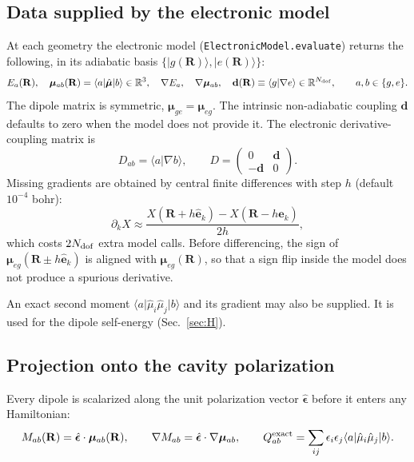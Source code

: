 \documentclass[11pt]{article}
\newcommand{\ket}[1]{\lvert #1 \rangle}
\newcommand{\bra}[1]{\langle #1 \rvert}
\newcommand{\braket}[2]{\langle #1 \vert #2 \rangle}
\newcommand{\R}{\mathbf{R}}
\newcommand{\grad}{\nabla}
\newcommand{\dd}{\mathbf{d}}
\newcommand{\eps}{\hat{\bm{\epsilon}}}
\newcommand{\mub}{\bm{\mu}}
\newcommand{\code}[1]{\texttt{#1}}
\begin{document}
\subsection{Data supplied by the electronic model}
At each geometry the electronic model (\code{ElectronicModel.evaluate}) returns the following, in its adiabatic basis $\{\ket{g(\R)},\ket{e(\R)}\}$:
\begin{equation}
E_a(\R),\quad \mub_{ab}(\R)=\bra{a}\hat{\mub}\ket{b}\in\mathbb{R}^3,\quad
\grad E_a,\quad \grad\mub_{ab},\quad
\dd(\R)\equiv\braket{g}{\grad e}\in\mathbb{R}^{N_{\rm dof}},
\qquad a,b\in\{g,e\}.
\end{equation}
The dipole matrix is symmetric, $\mub_{ge}=\mub_{eg}$. The intrinsic non-adiabatic coupling $\dd$ defaults to zero when the model does not provide it. The electronic derivative-coupling matrix is
\begin{equation}
D_{ab}=\braket{a}{\grad b},\qquad
D=\begin{pmatrix}0&\dd\\-\dd&0\end{pmatrix}.
\label{eq:Del}
\end{equation}
Missing gradients are obtained by central finite differences with step $h$ (default $10^{-4}$ bohr):
\begin{equation}
\partial_k X \approx \frac{X(\R+h\hat{\mathbf e}_k)-X(\R-h\hat{\mathbf e}_k)}{2h},
\label{eq:fd}
\end{equation}
which costs $2N_{\rm dof}$ extra model calls. Before differencing, the sign of $\mub_{eg}(\R\pm h\hat{\mathbf e}_k)$ is aligned with $\mub_{eg}(\R)$, so that a sign flip inside the model does not produce a spurious derivative.

An exact second moment $\bra{a}\hat\mu_i\hat\mu_j\ket{b}$ and its gradient may also be supplied. It is used for the dipole self-energy (Sec.~\ref{sec:H}).

\subsection{Projection onto the cavity polarization}
Every dipole is scalarized along the unit polarization vector $\eps$ before it enters any Hamiltonian:
\begin{equation}
M_{ab}(\R)=\eps\cdot\mub_{ab}(\R),\qquad \grad M_{ab}=\eps\cdot\grad\mub_{ab},\qquad
Q^{\rm exact}_{ab}=\sum_{ij}\epsilon_i\epsilon_j\bra{a}\hat\mu_i\hat\mu_j\ket{b}.
\end{equation}
\end{document}
